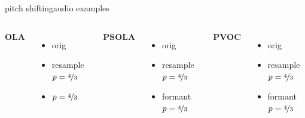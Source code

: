         \begin{frame}{pitch shifting}{audio examples}

                    \begin{columns}
                        \textbf{OLA}
                            \begin{itemize}
                                \item   orig 
                                \item   resample $p = \nicefrac{4}{3}$
                                \item   \color{gtgold}{formant} $p = \nicefrac{4}{3}$
                            \end{itemize}
                        \textbf{PSOLA}
                            \begin{itemize}
                                \item   orig 
                                \item   resample $p = \nicefrac{4}{3}$
                                \item   formant $p = \nicefrac{4}{3}$
                            \end{itemize}

                        \textbf{PVOC}
                            \begin{itemize}
                                \item   orig 
                                \item   resample $p = \nicefrac{4}{3}$ 
                                \item   formant $p = \nicefrac{4}{3}$ 
                            \end{itemize}
                    \end{columns}        
                \end{frame}
